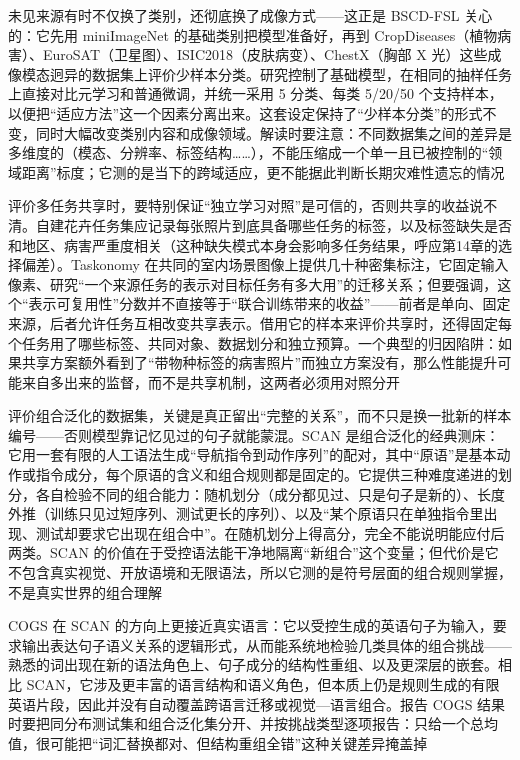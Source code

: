 未见来源有时不仅换了类别，还彻底换了成像方式——这正是 BSCD-FSL 关心的：它先用 miniImageNet 的基础类别把模型准备好，再到 CropDiseases（植物病害）、EuroSAT（卫星图）、ISIC2018（皮肤病变）、ChestX（胸部 X 光）这些成像模态迥异的数据集上评价少样本分类。研究控制了基础模型，在相同的抽样任务上直接对比元学习和普通微调，并统一采用 5 分类、每类 5/20/50 个支持样本，以便把“适应方法”这一个因素分离出来。这套设定保持了“少样本分类”的形式不变，同时大幅改变类别内容和成像领域。解读时要注意：不同数据集之间的差异是多维度的（模态、分辨率、标签结构……），不能压缩成一个单一且已被控制的“领域距离”标度；它测的是当下的跨域适应，更不能据此判断长期灾难性遗忘的情况

评价多任务共享时，要特别保证“独立学习对照”是可信的，否则共享的收益说不清。自建花卉任务集应记录每张照片到底具备哪些任务的标签，以及标签缺失是否和地区、病害严重度相关（这种缺失模式本身会影响多任务结果，呼应第14章的选择偏差）。Taskonomy 在共同的室内场景图像上提供几十种密集标注，它固定输入像素、研究“一个来源任务的表示对目标任务有多大用”的迁移关系；但要强调，这个“表示可复用性”分数并不直接等于“联合训练带来的收益”——前者是单向、固定来源，后者允许任务互相改变共享表示。借用它的样本来评价共享时，还得固定每个任务用了哪些标签、共同对象、数据划分和独立预算。一个典型的归因陷阱：如果共享方案额外看到了“带物种标签的病害照片”而独立方案没有，那么性能提升可能来自多出来的监督，而不是共享机制，这两者必须用对照分开

评价组合泛化的数据集，关键是真正留出“完整的关系”，而不只是换一批新的样本编号——否则模型靠记忆见过的句子就能蒙混。SCAN 是组合泛化的经典测床：它用一套有限的人工语法生成“导航指令到动作序列”的配对，其中“原语”是基本动作或指令成分，每个原语的含义和组合规则都是固定的。它提供三种难度递进的划分，各自检验不同的组合能力：随机划分（成分都见过、只是句子是新的）、长度外推（训练只见过短序列、测试更长的序列）、以及“某个原语只在单独指令里出现、测试却要求它出现在组合中”。在随机划分上得高分，完全不能说明能应付后两类。SCAN 的价值在于受控语法能干净地隔离“新组合”这个变量；但代价是它不包含真实视觉、开放语境和无限语法，所以它测的是符号层面的组合规则掌握，不是真实世界的组合理解

COGS 在 SCAN 的方向上更接近真实语言：它以受控生成的英语句子为输入，要求输出表达句子语义关系的逻辑形式，从而能系统地检验几类具体的组合挑战——熟悉的词出现在新的语法角色上、句子成分的结构性重组、以及更深层的嵌套。相比 SCAN，它涉及更丰富的语言结构和语义角色，但本质上仍是规则生成的有限英语片段，因此并没有自动覆盖跨语言迁移或视觉—语言组合。报告 COGS 结果时要把同分布测试集和组合泛化集分开、并按挑战类型逐项报告：只给一个总均值，很可能把“词汇替换都对、但结构重组全错”这种关键差异掩盖掉

